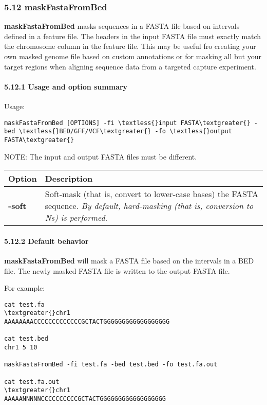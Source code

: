 \documentclass[letterpaper,10pt,english]{sphinxmanual}
\begin{document}
\subsubsection{5.12 maskFastaFromBed}
\label{content/maskfastafromBed:maskfastafrombed}\label{content/maskfastafromBed::doc}
\textbf{maskFastaFromBed} masks sequences in a FASTA file based on intervals defined in a feature file. The
headers in the input FASTA file must exactly match the chromosome column in the feature file. This
may be useful fro creating your own masked genome file based on custom annotations or for masking all
but your target regions when aligning sequence data from a targeted capture experiment.


\paragraph{5.12.1 Usage and option summary}
\label{content/maskfastafromBed:usage-and-option-summary}
Usage:

\begin{Verbatim}[commandchars=\\\{\}]
maskFastaFromBed [OPTIONS] -fi \textless{}input FASTA\textgreater{} -bed \textless{}BED/GFF/VCF\textgreater{} -fo \textless{}output FASTA\textgreater{}
\end{Verbatim}

NOTE: The input and output FASTA files must be different.

\begin{tabulary}{\linewidth}{|L|L|}
\hline
\textbf{
Option
} & \textbf{
Description
}\\\hline

\textbf{-soft}
 & 
Soft-mask (that is, convert to lower-case bases) the FASTA sequence. \emph{By default, hard-masking (that is, conversion to Ns) is performed}.
\\\hline
\end{tabulary}



\paragraph{5.12.2 Default behavior}
\label{content/maskfastafromBed:default-behavior}
\textbf{maskFastaFromBed} will mask a FASTA file based on the intervals in a BED file. The newly masked
FASTA file is written to the output FASTA file.

For example:

\begin{Verbatim}[commandchars=\\\{\}]
cat test.fa
\textgreater{}chr1
AAAAAAAACCCCCCCCCCCCCGCTACTGGGGGGGGGGGGGGGGGG

cat test.bed
chr1 5 10

maskFastaFromBed -fi test.fa -bed test.bed -fo test.fa.out

cat test.fa.out
\textgreater{}chr1
AAAAANNNNNCCCCCCCCCCGCTACTGGGGGGGGGGGGGGGGGG
\end{Verbatim}
\end{document}
